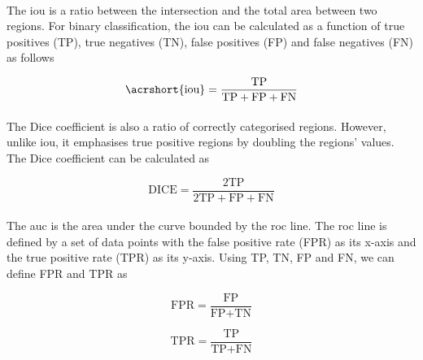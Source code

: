 \documentclass[12pt,oneside]{report}
\begin{document}
\paragraph{}
The \acrshort{iou} is a ratio between the intersection and the total area between two regions. For binary classification, the \acrshort{iou} can be calculated as a function of true positives (TP), true negatives (TN), false positives (FP) and false negatives (FN) as follows

\begin{equation}
    \text{\acrshort{iou}} =
    \frac
        {\text{TP}}
        {\text{TP} + \text{FP} + \text{FN}}
\end{equation}

\paragraph{}
The Dice coefficient is also a ratio of correctly categorised regions. However, unlike \acrshort{iou}, it emphasises true positive regions by doubling the regions' values. The Dice coefficient can be calculated as

\begin{equation}
    \text{DICE} =
    \frac
        {2 \text{TP}}
        {2 \text{TP} + \text{FP} + \text{FN}}
\end{equation}

\paragraph{}
The \acrshort{auc} is the area under the curve bounded by the \acrshort{roc} line. The \acrshort{roc} line is defined by a set of data points with the false positive rate (FPR) as its x-axis and the true positive rate (TPR) as its y-axis. Using TP, TN, FP and FN, we can define FPR and TPR as

\begin{equation}
    \text{FPR} =
    \frac{\text{FP}}{\text{FP} + \text{TN}}
\end{equation}

\begin{equation}
    \text{TPR} =
    \frac{\text{TP}}{\text{TP} + \text{FN}}
\end{equation}
\end{document}
